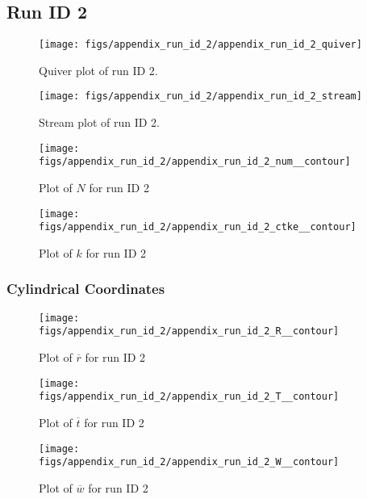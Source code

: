 \subsection{Run ID 2}
\begin{figure}[H]
\centering
\texttt{[image: figs/appendix\_run\_id\_2/appendix\_run\_id\_2\_quiver]}
\caption{Quiver plot of run ID 2.}
\label{fig:appendix_run_id_2_quiver}
\end{figure}


\begin{figure}[H]
\centering
\texttt{[image: figs/appendix\_run\_id\_2/appendix\_run\_id\_2\_stream]}
\caption{Stream plot of run ID 2.}
\label{fig:appendix_run_id_2_stream}
\end{figure}


\begin{figure}[H]
\centering
\texttt{[image: figs/appendix\_run\_id\_2/appendix\_run\_id\_2\_num\_\_contour]}
\caption{Plot of $N$ for run ID 2}
\label{fig:appendix_run_id_2_num__contour}
\end{figure}


\begin{figure}[H]
\centering
\texttt{[image: figs/appendix\_run\_id\_2/appendix\_run\_id\_2\_ctke\_\_contour]}
\caption{Plot of $k$ for run ID 2}
\label{fig:appendix_run_id_2_ctke__contour}
\end{figure}


\subsubsection{Cylindrical Coordinates}
\begin{figure}[H]
\centering
\texttt{[image: figs/appendix\_run\_id\_2/appendix\_run\_id\_2\_R\_\_contour]}
\caption{Plot of $\overline{r}$ for run ID 2}
\label{fig:appendix_run_id_2_R__contour}
\end{figure}


\begin{figure}[H]
\centering
\texttt{[image: figs/appendix\_run\_id\_2/appendix\_run\_id\_2\_T\_\_contour]}
\caption{Plot of $\overline{t}$ for run ID 2}
\label{fig:appendix_run_id_2_T__contour}
\end{figure}


\begin{figure}[H]
\centering
\texttt{[image: figs/appendix\_run\_id\_2/appendix\_run\_id\_2\_W\_\_contour]}
\caption{Plot of $\overline{w}$ for run ID 2}
\label{fig:appendix_run_id_2_W__contour}
\end{figure}


